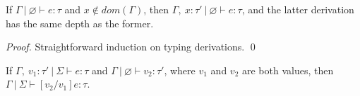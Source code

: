 \documentclass{llncs}
\begin{document}
\vspace{8pt}

\begin{lemma}[Weakening]
If $\Gamma~|~\varnothing \vdash e : \tau$ and $x \not\in dom(\Gamma)$, then $\Gamma,~x : \tau'~|~\varnothing \vdash e : \tau$, and the latter derivation has the same depth as the former.
\end{lemma}

\begin{proof}
Straightforward induction on typing derivations. \qed
\end{proof}

\vspace{8pt}

\begin{lemma}
If $\Gamma,~v_1 : \tau'~|~\Sigma \vdash e : \tau$ and $\Gamma~|~\varnothing \vdash v_2 : \tau'$, where $v_1$ and $v_2$ are both values, then $\Gamma~|~\Sigma \vdash [v_2/v_1]e : \tau$.
\end{lemma}
\end{document}
